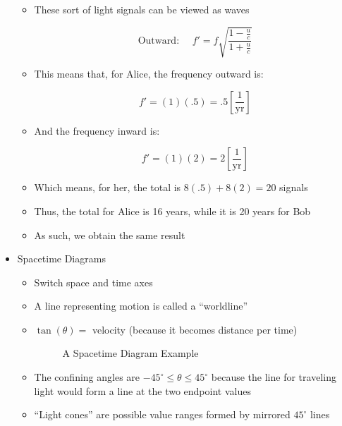 \begin{itemize}
\begin{itemize}
      \item These sort of light signals can be viewed as waves

        $$\boxed{\text{Outward:}\,\,\,\,\,\,\,\,f'=f\sqrt{\frac{1-\frac{u}{c}}{1+\frac{u}{c}}}}$$

      \item This means that, for Alice, the frequency outward is:

        $$f'=(1)(.5)=.5\left[\frac{1}{\text{yr}}\right]$$

      \item And the frequency inward is:

        $$f'=(1)(2)=2\left[\frac{1}{\text{yr}}\right]$$

      \item Which means, for her, the total is $8(.5) + 8(2) = 20$ signals

      \item Thus, the total for Alice is 16 years, while it is 20 years for Bob

      \item As such, we obtain the same result

    \end{itemize}

  \item Spacetime Diagrams

    \begin{itemize}

      \item Switch space and time axes

      \item A line representing motion is called a ``worldline''

      \item $\tan(\theta)=$ velocity (because it becomes distance per time)

        \begin{figure}[h!]
          \centering
          
          \caption{A Spacetime Diagram Example}
          \label{fig:4}
        \end{figure}

      \item The confining angles are $-45^{\circ}\leq\theta\leq45^{\circ}$ because the line for traveling light would form a line at the two endpoint values

      \item ``Light cones'' are possible value ranges formed by mirrored $45^{\circ}$ lines


\end{itemize}
\end{itemize}
